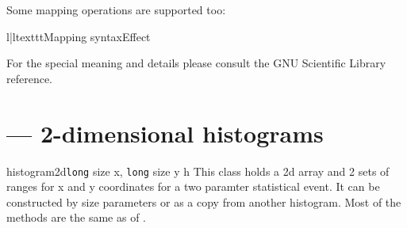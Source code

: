 Some mapping operations are supported too:\nopagebreak
\begin{tableii}{l|l}{texttt}{Mapping syntax}{Effect}
\end{tableii}

\begin{seealso}
For the special meaning and details please consult the GNU Scientific Library
reference.
\end{seealso}


\section{\protect{} --- 2-dimensional histograms}

\begin{classdesc}{histogram2d}{\texttt{long} size x, \texttt{long} size y
                               \code{|}  h}
This class holds a 2d array and 2 sets of ranges for x and y coordinates for a
two paramter statistical event. It can be constructed by size parameters or
as a copy from another histogram. Most of the methods are the same as of
.
\end{classdesc}

